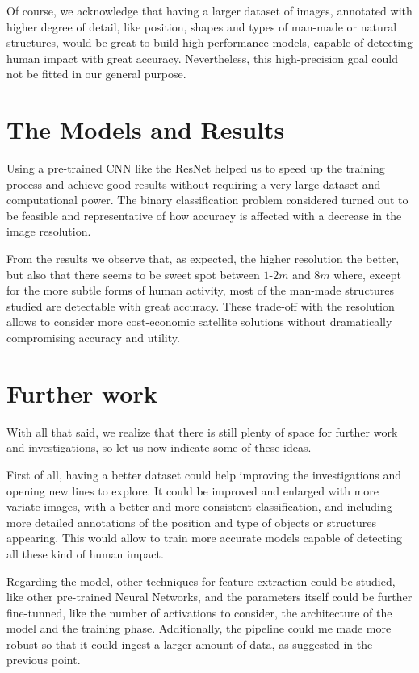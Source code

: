 Of course, we acknowledge that having a larger dataset of images, annotated with higher degree of detail, like position, shapes and types of man-made or natural structures, would be great to build high performance models, capable of detecting human impact with great accuracy. Nevertheless, this high-precision goal could not be fitted in our general purpose.

\section{The Models and Results}

Using a pre-trained CNN like the ResNet helped us to speed up the training process and achieve good results without requiring a very large dataset and computational power. The binary classification problem considered turned out to be feasible and representative of how accuracy is affected with a decrease in the image resolution. 

From the results we observe that, as expected, the higher resolution the better, but also that there seems to be sweet spot between $1$-$2m$ and $8m$ where, except for the more subtle forms of human activity, most of the man-made structures studied are detectable with great accuracy. These trade-off with the resolution allows to consider more cost-economic satellite solutions without dramatically compromising accuracy and utility.

\section{Further work}

With all that said, we realize that there is still plenty of space for further work and investigations, so let us now indicate some of these ideas.

First of all, having a better dataset could help improving the investigations and opening new lines to explore. It could be improved and enlarged with more variate images, with a better and more consistent classification, and including more detailed annotations of the position and type of objects or structures appearing. This would allow to train more accurate models capable of detecting all these kind of human impact.

Regarding the model, other techniques for feature extraction could be studied, like other pre-trained Neural Networks, and the parameters itself could be further fine-tunned, like the number of activations to consider, the architecture of the model and the training phase. Additionally, the pipeline could me made more robust so that it could ingest a larger amount of data, as suggested in the previous point.

